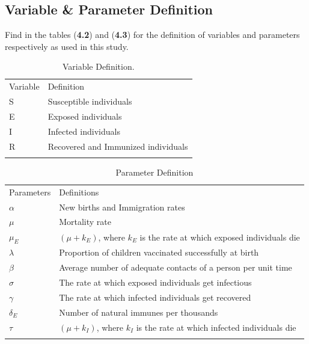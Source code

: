 \subsection{Variable \& Parameter Definition}
Find in the tables (\textbf{4.2}) and (\textbf{4.3}) for the definition of variables and parameters respectively as used in this study. 
\begin{table}
	\label{Variable}
	\caption{Variable Definition.}
	\centering
\begin{tabular}{ll}
	\hline\noalign{\smallskip}
	Variable & Definition \\ 
	\noalign{\smallskip}\hline\noalign{\smallskip}
	S & Susceptible individuals \\  
	E & Exposed individuals \\ 
	I & Infected individuals \\ 
	R & Recovered and Immunized individuals \\ 
	\hline\noalign{\smallskip}
\end{tabular}
\end{table}
\begin{table}
\label{tab:P}
\caption{Parameter Definition}
\centering
\begin{tabular}{ll}
	\hline\noalign{\smallskip}
	Parameters & Definitions\\ 
	\noalign{\smallskip}\hline\noalign{\smallskip}
	$\alpha$ & New births and Immigration rates\\ 
	$\mu$ & Mortality rate \\ 
	$\mu_{E}$ & $(\mu + k_{E})$, where $k_{E}$ is the rate at which exposed individuals die\\
	$\lambda$ & Proportion of children vaccinated successfully at birth \\ 
	$\beta$ & Average number of adequate contacts of a person per unit time \\ 
	$\sigma$ & The rate at which exposed individuals get infectious \\ 
	$\gamma$ & The rate at which infected individuals get recovered \\ 
	$ \delta_{E} $ & Number of natural immunes per thousands\\
	$\tau$ & $(\mu + k_{I})$, where $k_{I}$ is the rate at which infected individuals die\\
	\hline\noalign{\smallskip}
\end{tabular}
\end{table}
